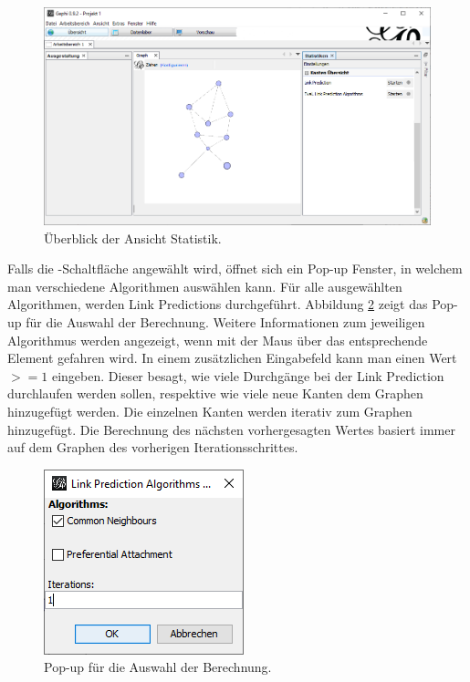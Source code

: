 \begin{figure}[!b]
    \includegraphics[width=\linewidth]{resources/sc1.png}
    \caption{Überblick der Ansicht Statistik.}
    \label{fig:screen1}
\end{figure}

Falls die -Schaltfläche angewählt wird, öffnet sich ein Pop-up Fenster, in welchem man verschiedene Algorithmen auswählen
kann. Für alle ausgewählten Algorithmen, werden Link Predictions durchgeführt. Abbildung \ref{fig:screen2} zeigt das Pop-up für die Auswahl der Berechnung. Weitere Informationen zum jeweiligen Algorithmus werden angezeigt, wenn mit der Maus über das entsprechende Element gefahren wird. In einem zusätzlichen Eingabefeld kann man einen Wert
$>= 1$ eingeben. Dieser besagt, wie viele Durchgänge bei der Link Prediction durchlaufen werden sollen, respektive wie viele
neue Kanten dem Graphen hinzugefügt werden. Die einzelnen Kanten werden iterativ zum Graphen hinzugefügt. Die Berechnung des nächsten vorhergesagten Wertes basiert immer auf dem Graphen des vorherigen Iterationsschrittes.

\begin{figure}
    \centering
    \includegraphics[width=0.5\linewidth]{resources/sc2.png}
    \caption{Pop-up für die Auswahl der Berechnung.}
    \label{fig:screen2}
\end{figure}


